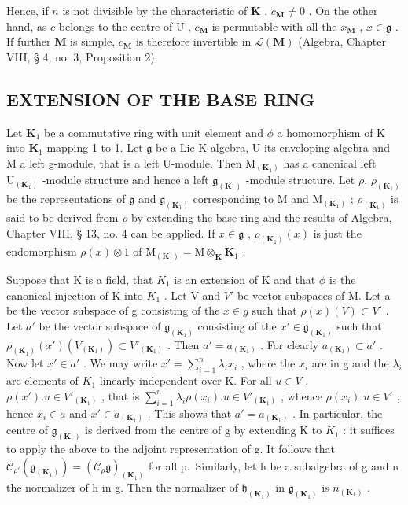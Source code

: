 Hence, if \(n\) is not divisible by the characteristic of \(\mathbf{K}\) , \(c_{\mathbf{M}} \neq 0\) . On the other hand, as \(c\) belongs to the centre of \(\mathrm{U}\) , \(c_{\mathbf{M}}\) is permutable with all the \(x_{\mathbf{M}}\) , \(x \in \mathfrak{g}\) . If further \(\mathbf{M}\) is simple, \(c_{\mathbf{M}}\) is therefore invertible in \(\mathcal{L}(\mathbf{M})\) (Algebra, Chapter VIII, § 4, no. 3, Proposition 2).

\subsection{EXTENSION OF THE BASE RING}

Let \(\mathbf{K}_1\) be a commutative ring with unit element and \(\phi\) a homomorphism of K into \(\mathbf{K}_1\) mapping 1 to 1. Let \(\mathfrak{g}\) be a Lie K-algebra, U its enveloping algebra and M a left g-module, that is a left U-module. Then \(\mathrm{M}_{(\mathbf{K}_1)}\) has a canonical left \(\mathrm{U}_{(\mathbf{K}_1)}\) -module structure and hence a left \(\mathfrak{g}_{(\mathbf{K}_1)}\) -module structure. Let \(\rho\), \(\rho_{(\mathbf{K}_1)}\) be the representations of \(\mathfrak{g}\) and \(\mathfrak{g}_{(\mathbf{K}_1)}\) corresponding to M and \(\mathrm{M}_{(\mathbf{K}_1)}\) ; \(\rho_{(\mathbf{K}_1)}\) is said to be derived from \(\rho\) by extending the base ring and the results of Algebra, Chapter VIII, § 13, no. 4 can be applied. If \(x \in \mathfrak{g}\) , \(\rho_{(\mathbf{K}_1)}(x)\) is just the endomorphism \(\rho(x) \otimes 1\) of \(\mathrm{M}_{(\mathbf{K}_1)} = \mathrm{M} \otimes_{\mathbf{K}} \mathbf{K}_1\) .

Suppose that K is a field, that \(K_{1}\) is an extension of K and that \(\phi\) is the canonical injection of K into \(K_{1}\) . Let V and \(V'\) be vector subspaces of M. Let a be the vector subspace of g consisting of the \(x \in g\) such that \(\rho(x)(V) \subset V'\) . Let \(a'\) be the vector subspace of \(\mathfrak{g}_{(\mathbf{K}_{1})}\) consisting of the \(x' \in \mathfrak{g}_{(\mathbf{K}_{1})}\) such that \(\rho_{(\mathbf{K}_{1})}(x')(V_{(\mathbf{K}_{1})}) \subset V'_{(\mathbf{K}_{1})}\) . Then \(a' = a_{(\mathbf{K}_{1})}\) . For clearly \(a_{(\mathbf{K}_{1})} \subset a'\) . Now let \(x' \in a'\) . We may write \(x' = \sum_{i=1}^{n} \lambda_{i} x_{i}\) , where the \(x_{i}\) are in g and the \(\lambda_{i}\) are elements of \(K_{1}\) linearly independent over K. For all \(u \in V\) , \(\rho(x') .u \in V'_{(\mathbf{K}_{1})}\) , that is \(\sum_{i=1}^{n} \lambda_{i} \rho(x_{i}) .u \in V'_{(\mathbf{K}_{1})}\) , whence \(\rho(x_{i}) .u \in V'\) , hence \(x_{i} \in a\) and \(x' \in a_{(\mathbf{K}_{1})}\) . This shows that \(a' = a_{(\mathbf{K}_{1})}\) . In particular, the centre of \(\mathfrak{g}_{(\mathbf{K}_{1})}\) is derived from the centre of g by extending K to \(K_{1}\) : it suffices to apply the above to the adjoint representation of g. It follows that \(\mathcal{C}_{\rho'}(\mathfrak{g}_{(\mathbf{K}_{1})}) = (\mathcal{C}_{\rho}\mathfrak{g})_{(\mathbf{K}_{1})}\) for all p.~Similarly, let h be a subalgebra of g and n the normalizer of h in g. Then the normalizer of \(\mathfrak{h}_{(\mathbf{K}_{1})}\) in \(\mathfrak{g}_{(\mathbf{K}_{1})}\) is \(n_{(\mathbf{K}_{1})}\) .

